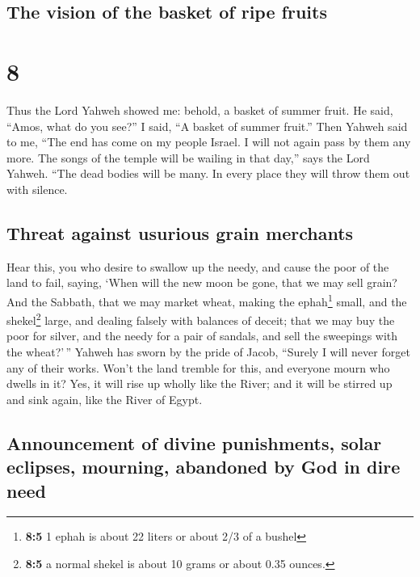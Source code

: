 \hypertarget{the-vision-of-the-basket-of-ripe-fruits}{%
\subsection{The vision of the basket of ripe
fruits}\label{the-vision-of-the-basket-of-ripe-fruits}}

\hypertarget{section-7}{%
\section{8}\label{section-7}}

 Thus the Lord Yahweh showed me: behold, a basket of
summer fruit.  He said, ``Amos, what do you see?'' I said,
``A basket of summer fruit.'' Then Yahweh said to me, ``The end has come
on my people Israel. I will not again pass by them any more.
 The songs of the temple will be wailing in that day,''
says the Lord Yahweh. ``The dead bodies will be many. In every place
they will throw them out with silence.

\hypertarget{threat-against-usurious-grain-merchants}{%
\subsection{Threat against usurious grain
merchants}\label{threat-against-usurious-grain-merchants}}

 Hear this, you who desire to swallow up the needy, and
cause the poor of the land to fail,  saying, `When will
the new moon be gone, that we may sell grain? And the Sabbath, that we
may market wheat, making the ephah\footnote{\textbf{8:5} 1 ephah is
  about 22 liters or about 2/3 of a bushel} small, and the
shekel\footnote{\textbf{8:5} a normal shekel is about 10 grams or about
  0.35 ounces.} large, and dealing falsely with balances of deceit;
 that we may buy the poor for silver, and the needy for a
pair of sandals, and sell the sweepings with the wheat?'\,''
 Yahweh has sworn by the pride of Jacob, ``Surely I will
never forget any of their works.  Won't the land tremble
for this, and everyone mourn who dwells in it? Yes, it will rise up
wholly like the River; and it will be stirred up and sink again, like
the River of Egypt.

\hypertarget{announcement-of-divine-punishments-solar-eclipses-mourning-abandoned-by-god-in-dire-need}{%
\subsection{Announcement of divine punishments, solar eclipses,
mourning, abandoned by God in dire
need}\label{announcement-of-divine-punishments-solar-eclipses-mourning-abandoned-by-god-in-dire-need}}

